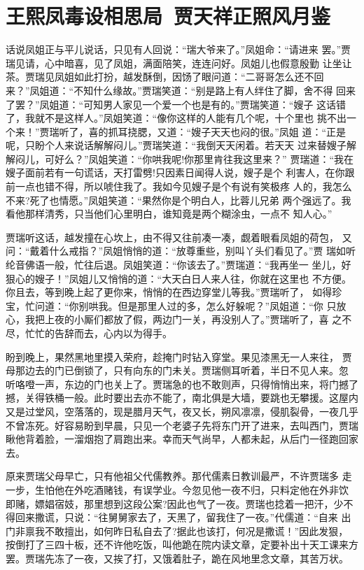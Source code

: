 \chapter{王熙凤毒设相思局~贾天祥正照风月鉴}

话说凤姐正与平儿说话，只见有人回说：“瑞大爷来了。”凤姐命：“请进来
罢。”贾瑞见请，心中暗喜，见了凤姐，满面陪笑，连连问好。凤姐儿也假意殷勤
让坐让茶。贾瑞见凤姐如此打扮，越发酥倒，因饧了眼问道：“二哥哥怎么还不回
来？”凤姐道：“不知什么缘故。”贾瑞笑道：“别是路上有人绊住了脚，舍不得
回来了罢？”凤姐道：“可知男人家见一个爱一个也是有的。”贾瑞笑道：“嫂子
这话错了，我就不是这样人。”凤姐笑道：“像你这样的人能有几个呢，十个里也
挑不出一个来！”贾瑞听了，喜的抓耳挠腮，又道：“嫂子天天也闷的很。”凤姐
道：“正是呢，只盼个人来说话解解闷儿。”贾瑞笑道：“我倒天天闲着。若天天
过来替嫂子解解闷儿，可好么？”凤姐笑道：“你哄我呢!你那里肯往我这里来？”
贾瑞道：“我在嫂子面前若有一句谎话，天打雷劈!只因素日闻得人说，嫂子是个
利害人，在你跟前一点也错不得，所以唬住我了。我如今见嫂子是个有说有笑极疼
人的，我怎么不来?死了也情愿。”凤姐笑道：“果然你是个明白人，比蓉儿兄弟
两个强远了。我看他那样清秀，只当他们心里明白，谁知竟是两个糊涂虫，一点不
知人心。”

贾瑞听这话，越发撞在心坎上，由不得又往前凑一凑，觑着眼看凤姐的荷包，
又问：“戴着什么戒指？”凤姐悄悄的道：“放尊重些，别叫丫头们看见了。”贾
瑞如听纶音佛语一般，忙往后退。凤姐笑道：“你该去了。”贾瑞道：“我再坐一
坐儿，好狠心的嫂子！”凤姐儿又悄悄的道：“大天白日人来人往，你就在这里也
不方便。你且去，等到晚上起了更你来，悄悄的在西边穿堂儿等我。”贾瑞听了，
如得珍宝，忙问道：“你别哄我。但是那里人过的多，怎么好躲呢？”凤姐道：“你
只放心，我把上夜的小厮们都放了假，两边门一关，再没别人了。”贾瑞听了，喜
之不尽，忙忙的告辞而去，心内以为得手。

盼到晚上，果然黑地里摸入荣府，趁掩门时钻入穿堂。果见漆黑无一人来往，
贾母那边去的门已倒锁了，只有向东的门未关。贾瑞侧耳听着，半日不见人来。忽
听咯噔一声，东边的门也关上了。贾瑞急的也不敢则声，只得悄悄出来，将门撼了
撼，关得铁桶一般。此时要出去亦不能了，南北俱是大墙，要跳也无攀援。这屋内
又是过堂风，空落落的，现是腊月天气，夜又长，朔风凛凛，侵肌裂骨，一夜几乎
不曾冻死。好容易盼到早晨，只见一个老婆子先将东门开了进来，去叫西门，贾瑞
瞅他背着脸，一溜烟抱了肩跑出来。幸而天气尚早，人都未起，从后门一径跑回家
去。

原来贾瑞父母早亡，只有他祖父代儒教养。那代儒素日教训最严，不许贾瑞多
走一步，生怕他在外吃酒赌钱，有误学业。今忽见他一夜不归，只料定他在外非饮
即赌，嫖娼宿妓，那里想到这段公案?因此也气了一夜。贾瑞也捻着一把汗，少不
得回来撒谎，只说：“往舅舅家去了，天黑了，留我住了一夜。”代儒道：“自来
出门非禀我不敢擅出，如何昨日私自去了?据此也该打，何况是撒谎！”因此发狠，
按倒打了三四十板，还不许他吃饭，叫他跪在院内读文章，定要补出十天工课来方
罢。贾瑞先冻了一夜，又挨了打，又饿着肚子，跪在风地里念文章，其苦万状。

